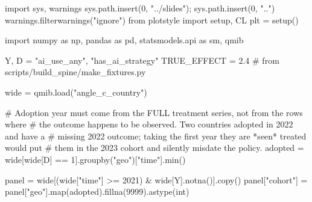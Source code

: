 \documentclass[
  letterpaper,
  10pt,
  twoside,
  openright,
  numbers=noenddot,
  chapterprefix=true]{scrbook}
\newenvironment{Shaded}{}{}
\newcommand{\BuiltInTok}[1]{\textcolor[rgb]{0.84,0.23,0.29}{#1}}
\newcommand{\CommentTok}[1]{\textcolor[rgb]{0.42,0.45,0.49}{#1}}
\newcommand{\DecValTok}[1]{\textcolor[rgb]{0.00,0.36,0.77}{#1}}
\newcommand{\FloatTok}[1]{\textcolor[rgb]{0.00,0.36,0.77}{#1}}
\newcommand{\ImportTok}[1]{\textcolor[rgb]{0.01,0.18,0.38}{#1}}
\newcommand{\NormalTok}[1]{\textcolor[rgb]{0.14,0.16,0.18}{#1}}
\newcommand{\OperatorTok}[1]{\textcolor[rgb]{0.14,0.16,0.18}{#1}}
\newcommand{\StringTok}[1]{\textcolor[rgb]{0.01,0.18,0.38}{#1}}
\begin{document}
\label{check-timing}
\begin{Shaded}
\begin{Highlighting}[]
\ImportTok{import}\NormalTok{ sys, warnings}
\NormalTok{sys.path.insert(}\DecValTok{0}\NormalTok{, }\StringTok{"../slides"}\NormalTok{)}\OperatorTok{;}\NormalTok{ sys.path.insert(}\DecValTok{0}\NormalTok{, }\StringTok{".."}\NormalTok{)}
\NormalTok{warnings.filterwarnings(}\StringTok{"ignore"}\NormalTok{)}
\ImportTok{from}\NormalTok{ plotstyle }\ImportTok{import}\NormalTok{ setup, CL}
\NormalTok{plt }\OperatorTok{=}\NormalTok{ setup()}

\ImportTok{import}\NormalTok{ numpy }\ImportTok{as}\NormalTok{ np, pandas }\ImportTok{as}\NormalTok{ pd, statsmodels.api }\ImportTok{as}\NormalTok{ sm, qmib}

\NormalTok{Y, D }\OperatorTok{=} \StringTok{"ai\_use\_any"}\NormalTok{, }\StringTok{"has\_ai\_strategy"}
\NormalTok{TRUE\_EFFECT }\OperatorTok{=} \FloatTok{2.4}               \CommentTok{\# from scripts/build\_spine/make\_fixtures.py}

\NormalTok{wide }\OperatorTok{=}\NormalTok{ qmib.load(}\StringTok{"angle\_c\_country"}\NormalTok{)}

\CommentTok{\# Adoption year must come from the FULL treatment series, not from the rows where}
\CommentTok{\# the outcome happens to be observed. Two countries adopted in 2022 and have a}
\CommentTok{\# missing 2022 outcome; taking the first year they are *seen* treated would put}
\CommentTok{\# them in the 2023 cohort and silently misdate the policy.}
\NormalTok{adopted }\OperatorTok{=}\NormalTok{ wide[wide[D] }\OperatorTok{==} \DecValTok{1}\NormalTok{].groupby(}\StringTok{"geo"}\NormalTok{)[}\StringTok{"time"}\NormalTok{].}\BuiltInTok{min}\NormalTok{()}

\NormalTok{panel }\OperatorTok{=}\NormalTok{ wide[(wide[}\StringTok{"time"}\NormalTok{] }\OperatorTok{\textgreater{}=} \DecValTok{2021}\NormalTok{) }\OperatorTok{\&}\NormalTok{ wide[Y].notna()].copy()}
\NormalTok{panel[}\StringTok{"cohort"}\NormalTok{] }\OperatorTok{=}\NormalTok{ panel[}\StringTok{"geo"}\NormalTok{].}\BuiltInTok{map}\NormalTok{(adopted).fillna(}\DecValTok{9999}\NormalTok{).astype(}\BuiltInTok{int}\NormalTok{)}


\end{Highlighting}
\end{Shaded}
\end{document}
